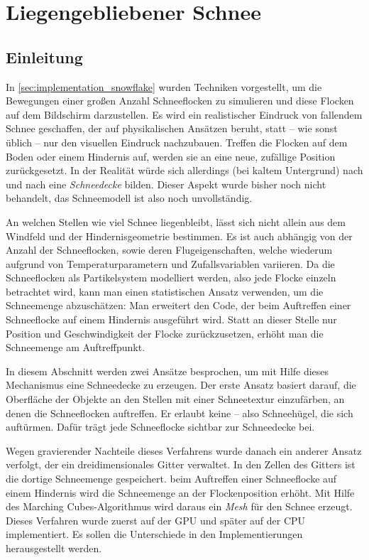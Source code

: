 \section{Liegengebliebener Schnee}
\label{sec:fallen_snow}

\subsection{Einleitung}

In \autoref{sec:implementation_snowflake} wurden Techniken
vorgestellt, um die Bewegungen einer großen Anzahl Schneeflocken zu
simulieren und diese Flocken auf dem Bildschirm darzustellen. Es wird
ein realistischer Eindruck von fallendem Schnee geschaffen, der auf
physikalischen Ansätzen beruht, statt -- wie sonst üblich -- nur den
visuellen Eindruck nachzubauen. Treffen die Flocken auf dem Boden oder
einem Hindernis auf, werden sie an eine neue, zufällige Position
zurückgesetzt. In der Realität würde sich allerdings (bei kaltem
Untergrund) nach und nach eine \emph{Schneedecke} bilden. Dieser
Aspekt wurde bisher noch nicht behandelt, das Schneemodell ist also
noch unvollständig.

An welchen Stellen wie viel Schnee liegenbleibt, lässt sich nicht
allein aus dem Windfeld und der Hindernisgeometrie bestimmen. Es ist
auch abhängig von der Anzahl der Schneeflocken, sowie deren
Flugeigenschaften, welche wiederum aufgrund von Temperaturparametern
und Zufallsvariablen variieren. Da die Schneeflocken als
Partikelsystem modelliert werden, also jede Flocke einzeln betrachtet
wird, kann man einen statistischen Ansatz verwenden, um die
Schneemenge abzuschätzen: Man erweitert den Code, der beim Auftreffen
einer Schneeflocke auf einem Hindernis ausgeführt wird. Statt an
dieser Stelle nur Position und Geschwindigkeit der Flocke
zurückzusetzen, erhöht man die Schneemenge am Auftreffpunkt.

In diesem Abschnitt werden zwei Ansätze besprochen, um mit Hilfe
dieses Mechanismus eine Schneedecke zu erzeugen. Der erste Ansatz
basiert darauf, die Oberfläche der Objekte an den Stellen mit einer
Schneetextur einzufärben, an denen die Schneeflocken auftreffen. Er
erlaubt keine  -- also Schneehügel, die
sich auftürmen. Dafür trägt jede Schneeflocke sichtbar zur Schneedecke
bei.

Wegen gravierender Nachteile dieses Verfahrens wurde danach ein
anderer Ansatz verfolgt, der ein dreidimensionales Gitter
verwaltet. In den Zellen des Gitters ist die dortige Schneemenge
gespeichert. beim Auftreffen einer Schneeflocke auf einem Hindernis
wird die Schneemenge an der Flockenposition erhöht. Mit Hilfe des
Marching Cubes-Algorithmus wird daraus ein \emph{Mesh} für den Schnee
erzeugt. Dieses Verfahren wurde zuerst auf der GPU und später auf der
CPU implementiert. Es sollen die Unterschiede in den Implementierungen
herausgestellt werden.

